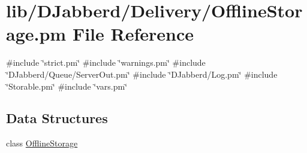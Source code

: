 \hypertarget{_offline_storage_8pm}{
\section{lib/\-D\-Jabberd/\-Delivery/\-Offline\-Storage.pm \-File \-Reference}
\label{_offline_storage_8pm}
}
{\ttfamily \#include \char`\"{}strict.\-pm\char`\"{}}\*
{\ttfamily \#include \char`\"{}warnings.\-pm\char`\"{}}\*
{\ttfamily \#include \char`\"{}\-D\-Jabberd/\-Queue/\-Server\-Out.\-pm\char`\"{}}\*
{\ttfamily \#include \char`\"{}\-D\-Jabberd/\-Log.\-pm\char`\"{}}\*
{\ttfamily \#include \char`\"{}\-Storable.\-pm\char`\"{}}\*
{\ttfamily \#include \char`\"{}vars.\-pm\char`\"{}}\*
\subsection*{\-Data \-Structures}
\begin{DoxyCompactItemize}
\item 
class \hyperlink{class_d_jabberd_1_1_delivery_1_1_offline_storage}{\-Offline\-Storage}
\end{DoxyCompactItemize}
